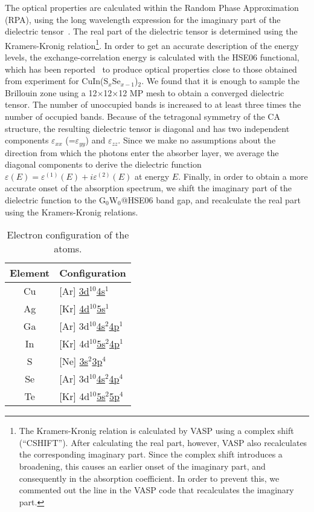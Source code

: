 \begin{refsection}
The optical properties are calculated within the Random Phase Approximation (RPA), using the long wavelength expression for the imaginary part of the dielectric tensor~\cite{Gajdos2006, Harl2007}. The real part of the dielectric tensor is determined using the Kramers-Kronig relation\footnote{The Kramers-Kronig relation is calculated by VASP using a complex shift (``CSHIFT''). After calculating the real part, however, VASP also recalculates the corresponding imaginary part. Since the complex shift introduces a broadening, this causes an earlier onset of the imaginary part, and consequently in the absorption coefficient. In order to prevent this, we commented out the line in the VASP code that recalculates the imaginary part.}. In order to get an accurate description of the energy levels, the exchange-correlation energy is calculated with the HSE06 functional, which has been reported~\cite{Wan2013} to produce optical properties close to those obtained from experiment for CuIn(S$_x$Se$_{x-1}$)$_2$. We found that it is enough to sample the Brillouin zone using a 12$\times$12$\times$12 MP mesh to obtain a converged dielectric tensor. The number of unoccupied bands is increased to at least three times the number of occupied bands. Because of the tetragonal symmetry of the CA structure, the resulting dielectric tensor is diagonal and has two independent components $\varepsilon_{xx}$ (=$\varepsilon_{yy}$) and $\varepsilon_{zz}$. Since we make no assumptions about the direction from which the photons enter the absorber layer, we average the diagonal components to derive the dielectric function $\varepsilon (E) = \varepsilon^{(1)} (E) + i \varepsilon^{(2)} (E) $ at energy $E$. Finally, in order to obtain a more accurate onset of the absorption spectrum, we shift the imaginary part of the dielectric function to the G$_0$W$_0$@HSE06 band gap, and recalculate the real part using the Kramers-Kronig relations. 

\begin{table}[htbp]
\centering
\setlength{\captionmargin}{20pt}
\renewcommand{\arraystretch}{1.2}
\caption{\label{tab:valElec}Electron configuration of the atoms.}
\begin{tabular}{c@{\hskip 2 em}l}\hline
Element & Configuration \\\hline
Cu & [Ar] \underline{3d$^{10}$4s$^1$} \\
Ag &[Kr] \underline{4d$^{10}$5s$^1$} \\
Ga &[Ar] 3d$^{10}$\underline{4s$^2$4p$^1$}\\
In &[Kr] 4d$^{10}$\underline{5s$^{2}$4p$^1$} \\
S &[Ne] \underline{3s$^2$3p$^4$} \\
Se &[Ar]  3d$^{10}$\underline{4s$^{2}$4p$^4$} \\
Te &[Kr] 4d$^{10}$\underline{5s$^2$5p$^4$}\\
\hline
\end{tabular}
\end{table}


\end{refsection}
